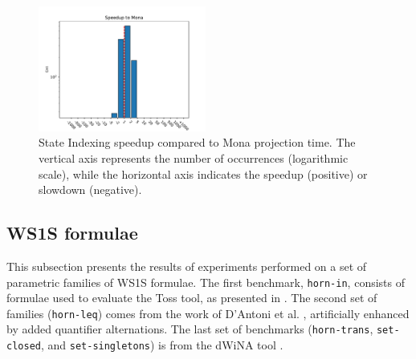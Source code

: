 \documentclass[pdflatex,sn-mathphys-num]{sn-jnl}%
\theoremstyle{thmstyleone}%
\theoremstyle{thmstyletwo}%
\theoremstyle{thmstylethree}%
\begin{document}
            \vspace*{-3em}

            \begin{figure}[h!]
                \centering
                \includegraphics[width=0.49\textwidth]{Figures/projection-first-speedup.pdf}
                \caption{State Indexing speedup compared to Mona projection time. The vertical axis represents the number of occurrences (logarithmic scale), while the horizontal axis indicates the speedup (positive) or slowdown (negative).}
                \label{figure:projection_first_speedup}
            \end{figure}

    \vspace*{-2em}

    \subsection{WS1S formulae}
        This subsection presents the results of experiments performed on a set of parametric families of WS1S formulae. The first benchmark, \texttt{horn-in}, consists of formulae used to evaluate the Toss tool, as presented in \cite{TOSS}. The second set of families (\texttt{horn-leq}) comes from the work of D'Antoni et al. \cite{DAntoni}, artificially enhanced by added quantifier alternations. The last set of benchmarks (\texttt{horn-trans}, \texttt{set-closed}, and \texttt{set-singletons}) is from the dWiNA tool \cite{dWiNA}.
\end{document}
